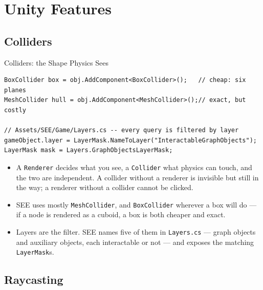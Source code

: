 
\section{Unity Features}



\subsection{Colliders}

\begin{frame}[fragile]{Colliders: the Shape Physics Sees}
  \begin{lstlisting}[basicstyle=\scriptsize\ttfamily]
BoxCollider box = obj.AddComponent<BoxCollider>();   // cheap: six planes
MeshCollider hull = obj.AddComponent<MeshCollider>();// exact, but costly

// Assets/SEE/Game/Layers.cs -- every query is filtered by layer
gameObject.layer = LayerMask.NameToLayer("InteractableGraphObjects");
LayerMask mask = Layers.GraphObjectsLayerMask;
  \end{lstlisting}
  \vspace{1ex}

  \begin{itemize}
    \item A \texttt{Renderer} decides what you see, a \texttt{Collider} what
      physics can touch, and the two are independent. A collider without a
      renderer is invisible but still in the way; a renderer without a
      collider cannot be clicked.
    \item SEE uses mostly \texttt{MeshCollider}, and \texttt{BoxCollider}
      wherever a box will do --- if a node is rendered as a cuboid, a box is both cheaper
      and exact.
    \item Layers are the filter. SEE names five of them in
      \texttt{Layers.cs} --- graph objects and auxiliary objects, each
      interactable or not --- and exposes the matching \texttt{LayerMask}s.
  \end{itemize}
\end{frame}

\subsection{Raycasting}

